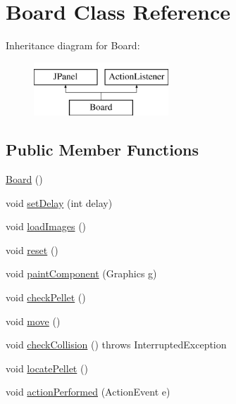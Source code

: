 \hypertarget{class_board}{}\section{Board Class Reference}
\label{class_board}
Inheritance diagram for Board\+:\begin{figure}[H]
\begin{center}
\leavevmode
\includegraphics[height=2.000000cm]{class_board}
\end{center}
\end{figure}
\subsection*{Public Member Functions}
\begin{DoxyCompactItemize}
\item 
\hyperlink{class_board_ab5e792f71e2fbff747bf7b52859f2a98}{Board} ()
\item 
void \hyperlink{class_board_aa3a8c18495cd2acb36b6227a008861a0}{set\+Delay} (int delay)
\item 
void \hyperlink{class_board_a2a8e54034cf6e22a174e668b54d57368}{load\+Images} ()
\item 
void \hyperlink{class_board_a510b3c25a75fbfdc3a2d4bd0660cf958}{reset} ()
\item 
void \hyperlink{class_board_a05f7155d1fb7219fa0081ddbe68bdcad}{paint\+Component} (Graphics g)
\item 
void \hyperlink{class_board_a1bd348eafebfa5845ff0d8ed9c11f341}{check\+Pellet} ()
\item 
void \hyperlink{class_board_a916df1693e14ee32843e7d2a6ed1b1b6}{move} ()
\item 
void \hyperlink{class_board_a8eef2b7fbeb8fb80037c793ca2d04e8f}{check\+Collision} ()  throws Interrupted\+Exception 
\item 
void \hyperlink{class_board_a93eeb133b26a224fe23447478700d8c7}{locate\+Pellet} ()
\item 
void \hyperlink{class_board_ae4495c39178937ad35a9838e816e8953}{action\+Performed} (Action\+Event e)
\end{DoxyCompactItemize}
